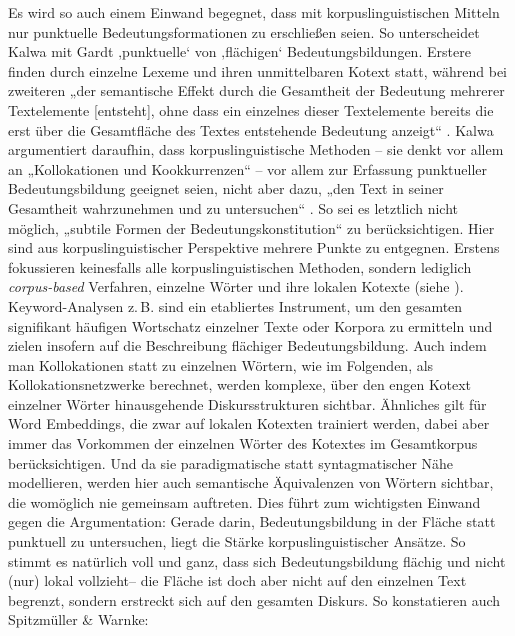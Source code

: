 Es wird so auch einem Einwand begegnet, dass mit korpuslinguistischen Mitteln nur punktuelle Bedeutungsformationen zu erschließen seien. So unterscheidet Kalwa \autocite*[14]{kalwaKonstitutionKonzeptenDiskursen2019} mit Gardt \autocite*{gardtTextanalyseAlsBasis2013} ‚punktuelle` von ‚flächigen` Bedeutungsbildungen. Erstere finden durch einzelne Lexeme und ihren unmittelbaren Kotext statt, während bei zweiteren „der semantische Effekt durch die Gesamtheit der Bedeutung mehrerer Textelemente {[}entsteht{]}, ohne dass ein einzelnes dieser Textelemente bereits die erst über die Gesamtfläche des Textes entstehende Bedeutung anzeigt`` \autocite[45]{gardtTextanalyseAlsBasis2013}. Kalwa argumentiert daraufhin, dass korpuslinguistische Methoden -- sie denkt vor allem an „Kollokationen und Kookkurrenzen`` \autocite[15]{kalwaKonstitutionKonzeptenDiskursen2019} -- vor allem zur Erfassung punktueller Bedeutungsbildung geeignet seien, nicht aber dazu, „den Text in seiner Gesamtheit wahrzunehmen und zu untersuchen`` \autocite[14]{kalwaKonstitutionKonzeptenDiskursen2019}. So sei es letztlich nicht möglich, „subtile Formen der Bedeutungskonstitution`` \autocite[20]{kalwaKonstitutionKonzeptenDiskursen2019} zu berücksichtigen. Hier sind aus korpuslinguistischer Perspektive mehrere Punkte zu entgegnen. Erstens fokussieren keinesfalls alle korpuslinguistischen Methoden, sondern lediglich \emph{corpus-based} Verfahren, einzelne Wörter und ihre lokalen Kotexte (siehe ). Keyword-Analysen z.\,B. sind ein etabliertes Instrument, um den gesamten signifikant häufigen Wortschatz einzelner Texte oder Korpora zu ermitteln und zielen insofern auf die Beschreibung flächiger Bedeutungsbildung. Auch indem man Kollokationen statt zu einzelnen Wörtern, wie im Folgenden, als Kollokationsnetzwerke berechnet, werden komplexe, über den engen Kotext einzelner Wörter hinausgehende Diskursstrukturen sichtbar. Ähnliches gilt für Word Embeddings, die zwar auf lokalen Kotexten trainiert werden, dabei aber immer das Vorkommen der einzelnen Wörter des Kotextes im Gesamtkorpus berücksichtigen. Und da sie paradigmatische statt syntagmatischer Nähe modellieren, werden hier auch semantische Äquivalenzen von Wörtern sichtbar, die womöglich nie gemeinsam auftreten. Dies führt zum wichtigsten Einwand gegen die Argumentation: Gerade darin, Bedeutungsbildung in der Fläche statt punktuell zu untersuchen, liegt die Stärke korpuslinguistischer Ansätze. So stimmt es natürlich voll und ganz, dass sich Bedeutungsbildung flächig und nicht (nur) lokal vollzieht-- die Fläche ist doch aber nicht auf den einzelnen Text begrenzt, sondern erstreckt sich auf den gesamten Diskurs. So konstatieren auch Spitzmüller \& Warnke:

